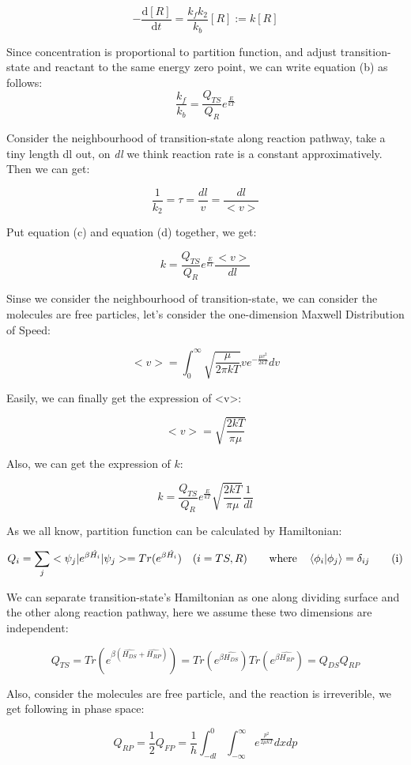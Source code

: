 \[-\frac{\mathrm{d} {[R]}}{\mathrm{d} t} = \frac{k_fk_2}{k_b}[R] :=k[R]\]

Since concentration is proportional to partition function, and adjust transition-state and reactant to the same energy zero point, we can write equation (b) as follows:
\[\frac{k_f}{k_b}= \frac{Q_{TS}}{Q_R} e^{\frac{E}{kT}} \tag{c} \]

Consider the neighbourhood of transition-state along reaction pathway, take a tiny length dl out, on \textit{dl} we think reaction rate is a constant approximatively. Then we can get:

\[\frac{1}{k_2}= \tau = \frac{dl}{v} = \frac{dl}{<v>} \tag {d} \]

Put equation (c) and equation (d) together, we get:

\[k= \frac{Q_{TS}}{Q_R} e^{\frac{E}{kT}} \frac{<v>}{dl} \tag{e} \]

Sinse we consider the neighbourhood of transition-state, we can consider the molecules are free particles, let's consider the one-dimension Maxwell Distribution of Speed:

\[<v> = \int_{0}^{\infty}\sqrt{\frac{\mu}{2 \pi kT}}ve^{ - \frac{\mu v^2}{2kT}}dv \tag{f} \]

Easily, we can finally get the expression of <v>:

\[<v>=\sqrt{\frac{2kT}{\pi \mu}} \tag{g}\]

Also, we can get the expression of $k$:

\[k= \frac{Q_{TS}}{Q_R} e^{\frac{E}{kT}} \sqrt{\frac{2kT}{\pi \mu}} \frac{1}{dl} \tag{h} \]

As we all know, partition function can be calculated by Hamiltonian:

\[Q_i = \sum_j<\psi_j|e^{\beta \hat{H_i}}|\psi_j>=Tr{(e^{\beta \hat{H_i}})} \quad (i=TS,R) \qquad \text{where} \quad \bra{\phi_i}\ket{\phi_j}=\delta_{ij} \tag{i}\]

We can separate transition-state's Hamiltonian as one along dividing surface and the other along reaction pathway, here we assume these two dimensions are independent:

\[Q_{TS} =Tr{(e^{\beta (\hat{H_{DS}}+\hat{H_{RP}})})}=Tr{(e^{\beta \hat{H_{DS}}})}Tr{(e^{\beta \hat{H_{RP}}})}=Q_{DS}Q_{RP} \tag{j}\]

Also, consider the molecules are free particle, and the reaction is irreverible, we get following in phase space:

\[Q_{RP}=\frac{1}{2}Q_{FP}=\frac{1}{h}\int_{-dl}^{0}\int_{-\infty}^{\infty}e^{\frac{p^2}{2 \mu kT}}dxdp \tag{k}\]

